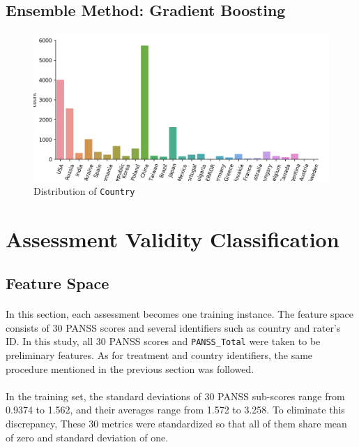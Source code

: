 \documentclass[11pt]{article}
\begin{document}
	\subsection{Ensemble Method: Gradient Boosting}
	
	\begin{figure}[H]
		\centering
		\includegraphics[width=0.7\linewidth]{figures/dist_country.png}
		\caption{Distribution of \texttt{Country}}
	\end{figure}


	\section{Assessment Validity Classification}
	\subsection{Feature Space}
	\paragraph{} In this section, each assessment becomes one training instance. The feature space consists of 30 PANSS scores and several identifiers such as country and rater's ID. In this study, all 30 PANSS scores and \texttt{PANSS\_Total} were taken to be preliminary features. As for treatment and country identifiers, the same procedure mentioned in the previous section was followed.
	\paragraph{} In the training set, the standard deviations of 30 PANSS sub-scores range from 0.9374 to 1.562, and their averages range from 1.572 to 3.258. To eliminate this discrepancy, These 30 metrics were standardized so that all of them share mean of zero and standard deviation of one.
\end{document}
